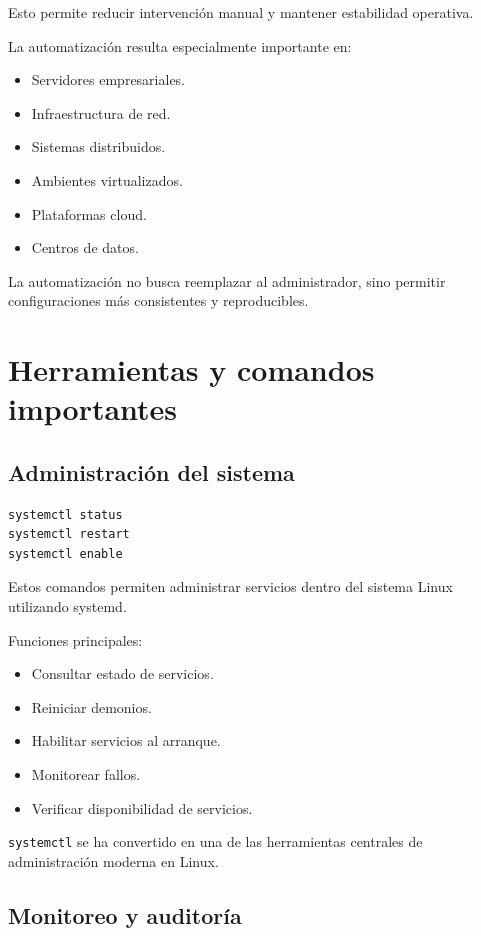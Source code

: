 \documentclass[11pt, letterpaper]{article}
\begin{document}
Esto permite reducir intervención manual y mantener estabilidad operativa.

La automatización resulta especialmente importante en:

\begin{itemize}
\item Servidores empresariales.
\item Infraestructura de red.
\item Sistemas distribuidos.
\item Ambientes virtualizados.
\item Plataformas cloud.
\item Centros de datos.
\end{itemize}

La automatización no busca reemplazar al administrador, sino permitir configuraciones más consistentes y reproducibles.

\newpage
\section{Herramientas y comandos importantes}
\label{sec:orgc4e0c86}

\subsection{Administración del sistema}
\label{sec:org3624b25}

\begin{verbatim}
systemctl status
systemctl restart
systemctl enable
\end{verbatim}

Estos comandos permiten administrar servicios dentro del sistema Linux utilizando systemd.

Funciones principales:

\begin{itemize}
\item Consultar estado de servicios.
\item Reiniciar demonios.
\item Habilitar servicios al arranque.
\item Monitorear fallos.
\item Verificar disponibilidad de servicios.
\end{itemize}

\texttt{systemctl} se ha convertido en una de las herramientas centrales de administración moderna en Linux.
\subsection{Monitoreo y auditoría}
\label{sec:org7d6d556}
\end{document}
